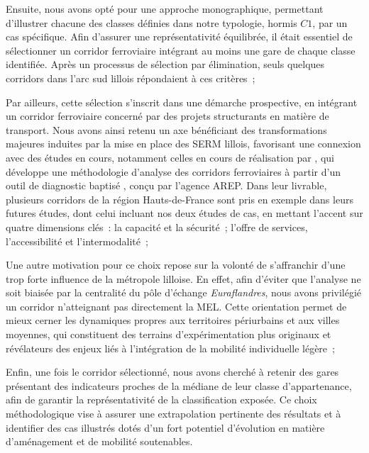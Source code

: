 \begin{refsegment}
\begin{customitemize}
    \item Ensuite, nous avons opté pour une approche monographique, permettant d'illustrer chacune des classes définies dans notre typologie, hormis \(C1\), par un cas spécifique. Afin d'assurer une représentativité équilibrée, il était essentiel de sélectionner un corridor ferroviaire intégrant au moins une gare de chaque classe identifiée. Après un processus de sélection par élimination, seuls quelques corridors dans l'arc sud lillois répondaient à ces critères~;
    \item Par ailleurs, cette sélection s'inscrit dans une démarche prospective, en intégrant un corridor ferroviaire concerné par des projets structurants en matière de transport. Nous avons ainsi retenu un axe bénéficiant des transformations majeures induites par la mise en place des \acrfull{SERM} lillois, favorisant une connexion avec des études en cours, notamment celles en cours de réalisation par \textcolor{blue}{\textcite[3]{sncf_gares__connexions_connecter_2024}}, qui développe une méthodologie d'analyse des corridors ferroviaires à partir d'un outil de diagnostic baptisé , conçu par l'agence \acrfull{AREP}. Dans leur livrable, plusieurs corridors de la région Hauts-de-France sont pris en exemple dans leurs futures études, dont celui incluant nos deux études de cas, en mettant l'accent sur quatre dimensions clés~: la capacité et la sécurité~; l'offre de services, l'accessibilité et l'intermodalité~;
    \item Une autre motivation pour ce choix repose sur la volonté de s'affranchir d'une trop forte influence de la métropole lilloise. En effet, afin d'éviter que l'analyse ne soit biaisée par la centralité du pôle d'échange \textsl{Euraflandres}, nous avons privilégié un corridor n'atteignant pas directement la \acrshort{MEL}. Cette orientation permet de mieux cerner les dynamiques propres aux territoires périurbains et aux villes moyennes, qui constituent des terrains d'expérimentation plus originaux et révélateurs des enjeux liés à l'intégration de la mobilité individuelle légère~;
    \item Enfin, une fois le corridor sélectionné, nous avons cherché à retenir des gares présentant des indicateurs proches de la médiane de leur classe d'appartenance, afin de garantir la représentativité de la classification exposée. Ce choix méthodologique vise à assurer une extrapolation pertinente des résultats et à identifier des cas illustrés dotés d'un fort potentiel d'évolution en matière d'aménagement et de mobilité soutenables.
\end{customitemize}


\end{refsegment}
